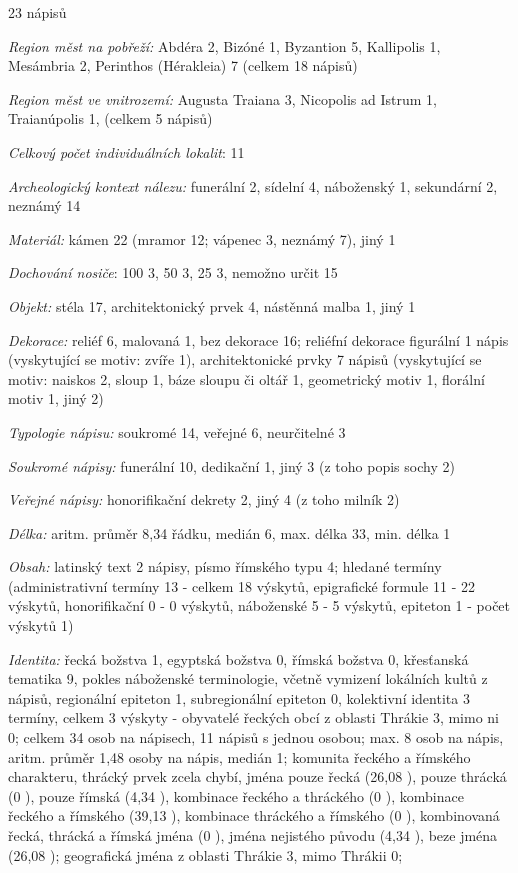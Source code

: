 \placetable[none]{}
\starttable[|l|]
\HL
{} 23 nápisů

{\em Region měst na pobřeží:} Abdéra 2, Bizóné 1, Byzantion 5, Kallipolis 1, Mesámbria 2, Perinthos (Hérakleia) 7 (celkem 18 nápisů)

{\em Region měst ve vnitrozemí:} Augusta Traiana 3, Nicopolis ad Istrum 1, Traianúpolis 1, (celkem 5 nápisů)

{\em Celkový počet individuálních lokalit}: 11

{\em Archeologický kontext nálezu:} funerální 2, sídelní 4, náboženský 1, sekundární 2, neznámý 14

{\em Materiál:} kámen 22 (mramor 12; vápenec 3, neznámý 7), jiný 1

{\em Dochování nosiče}: 100  3, 50  3, 25  3, nemožno určit 15

{\em Objekt:} stéla 17, architektonický prvek 4, nástěnná malba 1, jiný 1

{\em Dekorace:} reliéf 6, malovaná 1, bez dekorace 16; reliéfní dekorace figurální 1 nápis (vyskytující se motiv: zvíře 1), architektonické prvky 7 nápisů (vyskytující se motiv: naiskos 2, sloup 1, báze sloupu či oltář 1, geometrický motiv 1, florální motiv 1, jiný 2)

{\em Typologie nápisu:} soukromé 14, veřejné 6, neurčitelné 3

{\em Soukromé nápisy:} funerální 10, dedikační 1, jiný 3 (z toho popis sochy 2)

{\em Veřejné nápisy:} honorifikační dekrety 2, jiný 4 (z toho milník 2)

{\em Délka:} aritm. průměr 8,34 řádku, medián 6, max. délka 33, min. délka 1

{\em Obsah:} latinský text 2 nápisy, písmo římského typu 4; hledané termíny (administrativní termíny 13 - celkem 18 výskytů, epigrafické formule 11 - 22 výskytů, honorifikační 0 - 0 výskytů, náboženské 5 - 5 výskytů, epiteton 1 - počet výskytů 1)

{\em Identita:} řecká božstva 1, egyptská božstva 0, římská božstva 0, křesťanská tematika 9, pokles náboženské terminologie, včetně vymizení lokálních kultů z nápisů, regionální epiteton 1, subregionální epiteton 0, kolektivní identita 3 termíny, celkem 3 výskyty - obyvatelé řeckých obcí z oblasti Thrákie 3, mimo ni 0; celkem 34 osob na nápisech, 11 nápisů s jednou osobou; max. 8 osob na nápis, aritm. průměr 1,48 osoby na nápis, medián 1; komunita řeckého a římského charakteru, thrácký prvek zcela chybí, jména pouze řecká (26,08 ), pouze thrácká (0 ), pouze římská (4,34 ), kombinace řeckého a thráckého (0 ), kombinace řeckého a římského (39,13 ), kombinace thráckého a římského (0 ), kombinovaná řecká, thrácká a římská jména (0 ), jména nejistého původu (4,34 ), beze jména (26,08 ); geografická jména z oblasti Thrákie 3, mimo Thrákii 0;

